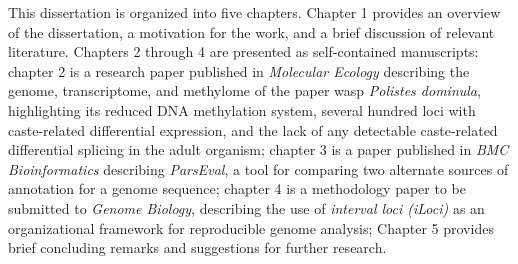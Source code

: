 This dissertation is organized into five chapters.
Chapter 1 provides an overview of the dissertation, a motivation for the work, and a brief discussion of relevant literature.
Chapters 2 through 4 are presented as self-contained manuscripts:
chapter 2 is a research paper published in \textit{Molecular Ecology} describing the genome, transcriptome, and methylome of the paper wasp \textit{Polistes dominula}, highlighting its reduced DNA methylation system, several hundred loci with caste-related differential expression, and the lack of any detectable caste-related differential splicing in the adult organism;
chapter 3 is a paper published in \textit{BMC Bioinformatics} describing \textit{ParsEval}, a tool for comparing two alternate sources of annotation for a genome sequence;
chapter 4 is a methodology paper to be submitted to \textit{Genome Biology}, describing the use of \textit{interval loci (iLoci)} as an organizational framework for reproducible genome analysis;
Chapter 5 provides brief concluding remarks and suggestions for further research.
